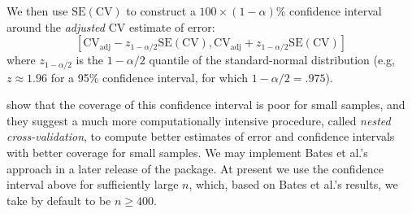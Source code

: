 \documentclass[
]{jss}
\begin{document}
We then use \(\mathrm{SE}(\mathrm{CV})\) to construct a
\(100 \times (1 - \alpha)\)\% confidence interval around the
\emph{adjusted} CV estimate of error: \[
\left[ \mathrm{CV}_{\mathrm{adj}} - z_{1 - \alpha/2}\mathrm{SE}(\mathrm{CV}), \mathrm{CV}_{\mathrm{adj}} + z_{1 - \alpha/2}\mathrm{SE}(\mathrm{CV})  \right]
\] where \(z_{1 - \alpha/2}\) is the \(1 - \alpha/2\) quantile of the
standard-normal distribution (e.g, \(z \approx 1.96\) for a 95\%
confidence interval, for which \(1 - \alpha/2 = .975\)).

\citet{BatesHastieTibshirani:2023} show that the coverage of this
confidence interval is poor for small samples, and they suggest a much
more computationally intensive procedure, called \emph{nested
cross-validation}, to compute better estimates of error and confidence
intervals with better coverage for small samples. We may implement Bates
et al.'s approach in a later release of the  package. At present
we use the confidence interval above for sufficiently large \(n\),
which, based on Bates et al.'s results, we take by default to be
\(n \ge 400\).


\end{document}
